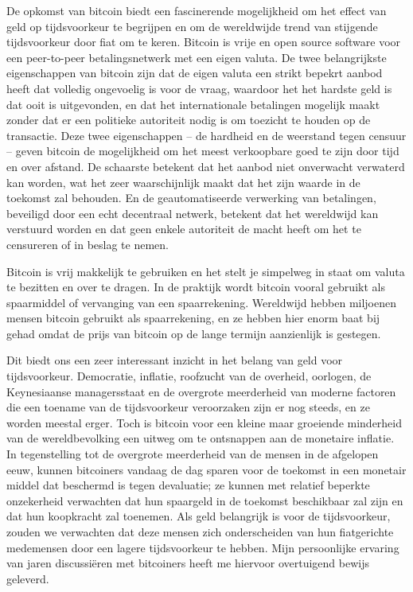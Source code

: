 De opkomst van bitcoin biedt een fascinerende mogelijkheid om het effect van geld op tijdsvoorkeur te begrijpen en om de wereldwijde trend van stijgende tijdsvoorkeur door fiat om te keren. Bitcoin is vrije en open source software voor een peer-to-peer betalingsnetwerk met een eigen valuta. De twee belangrijkste eigenschappen van bitcoin zijn dat de eigen valuta een strikt bepekrt aanbod heeft dat volledig ongevoelig is voor de vraag, waardoor het het hardste geld is dat ooit is uitgevonden, en dat het internationale betalingen mogelijk maakt zonder dat er een politieke autoriteit nodig is om toezicht te houden op de transactie. Deze twee eigenschappen -- de hardheid en de weerstand tegen censuur -- geven bitcoin de mogelijkheid om het meest verkoopbare goed te zijn door tijd en over afstand. De schaarste betekent dat het aanbod niet onverwacht verwaterd kan worden, wat het zeer waarschijnlijk maakt dat het zijn waarde in de toekomst zal behouden. En de geautomatiseerde verwerking van betalingen, beveiligd door een echt decentraal netwerk, betekent dat het wereldwijd kan verstuurd worden en dat geen enkele autoriteit de macht heeft om het te censureren of in beslag te nemen.

Bitcoin is vrij makkelijk te gebruiken en het stelt je simpelweg in staat om valuta te bezitten en over te dragen. In de praktijk wordt bitcoin vooral gebruikt als spaarmiddel of vervanging van een spaarrekening. Wereldwijd hebben miljoenen mensen bitcoin gebruikt als spaarrekening, en ze hebben hier enorm baat bij gehad omdat de prijs van bitcoin op de lange termijn aanzienlijk is gestegen.

Dit biedt ons een zeer interessant inzicht in het belang van geld voor tijdsvoorkeur. Democratie, inflatie, roofzucht van de overheid, oorlogen, de Keynesiaanse managersstaat en de overgrote meerderheid van moderne factoren die een toename van de tijdsvoorkeur veroorzaken zijn er nog steeds, en ze worden meestal erger. Toch is bitcoin voor een kleine maar groeiende minderheid van de wereldbevolking een uitweg om te ontsnappen aan de monetaire inflatie. In tegenstelling tot de overgrote meerderheid van de mensen in de afgelopen eeuw, kunnen bitcoiners vandaag de dag sparen voor de toekomst in een monetair middel dat beschermd is tegen devaluatie; ze kunnen met relatief beperkte onzekerheid verwachten dat hun spaargeld in de toekomst beschikbaar zal zijn en dat hun koopkracht zal toenemen. Als geld belangrijk is voor de tijdsvoorkeur, zouden we verwachten dat deze mensen zich onderscheiden van hun fiatgerichte medemensen door een lagere tijdsvoorkeur te hebben. Mijn persoonlijke ervaring van jaren discussiëren met bitcoiners heeft me hiervoor overtuigend bewijs geleverd.

